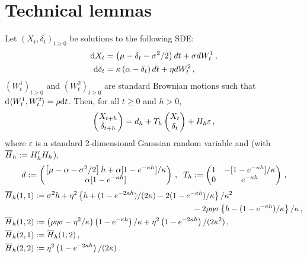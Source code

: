\appendix

\section{Technical lemmas}%
\begin{lemma}
\label{lem:integratedSDE}
Let $(X_t,\delta_t)_{t\ge0}$ be solutions to the following SDE:
\begin{align*}
\mathrm{d} X_t &= \left(\mu - \delta_t- \sigma^2/2 \right) dt + \sigma d W^1_t \,,\\
\mathrm{d} \delta_t &= \kappa\left( \alpha - \delta_t\right)dt + \eta dW^2_t \,,
\end{align*}
$(W_t^1)_{t\ge 0}$ and $(W_t^2)_{t\ge 0}$ are standard Brownian motions such that $\mathrm{d} \langle W_t^1,W_t^2 \rangle = \rho\mathrm{d} t$.
Then, for all $t\ge 0$ and $h>0$,
\[
\begin{pmatrix} X_{t+h} \\ \delta_{t+h}\end{pmatrix} = d_h + T_h\begin{pmatrix} X_{t} \\ \delta_{t}\end{pmatrix} + H_h\varepsilon\,,
\]
where $\varepsilon$ is a standard 2-dimensional Gaussian random variable and (with $\overline{H}_h:= H_h'H_h$),
\[
d :=
\begin{pmatrix} \left[\mu- \alpha - \sigma^2/2 \right] h + \alpha[1-e^{-\kappa h}]/\kappa\\
\alpha [1-e^{-\kappa h}] \end{pmatrix}\,, \;\; T_h :=
\begin{pmatrix} 1 & -[1-e^{-\kappa h}]/\kappa \\ 0 & e^{-\kappa h} \end{pmatrix} \,,
\]
\begin{align*}
\barH_h(1,1) & \eqdef \sigma^2 h+ \eta^2\left\{h + (1-e^{-2\kappa h})/(2\kappa) - 2(1-e^{-\kappa h})/\kappa  \right\}/\kappa^2 \\
&\hspace{7cm} -2\rho\eta\sigma\left\{h - (1-e^{-\kappa h})/\kappa \right\}/\kappa\eqsp, \\
\barH_h(1,2) & \eqdef \left(\rho \eta \sigma-\eta^2/\kappa\right)\left(1-e^{-\kappa h} \right)/\kappa + \eta^2\left(1-e^{-2\kappa h} \right)/(2\kappa^2)\eqsp,\\
\barH_h(2,1) & \eqdef \barH_h(1,2)\eqsp,\\
\barH_h(2,2) & \eqdef \eta^2\left( 1-e^{-2\kappa h} \right)/(2\kappa)\eqsp.
\end{align*}
\end{lemma}

